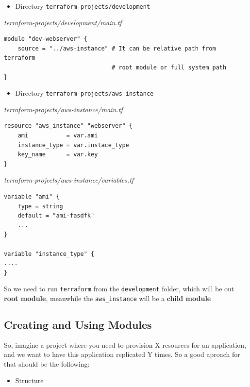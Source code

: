 \documentclass{article}
\newenvironment{codetemplate}[1][]{%
  \mybasecolorbox[#1]
  \itshape
}{%
  \endmybasecolorbox
}
\begin{document}
\begin{itemize}
    \item Directory \verb|terraform-projects/development|
\end{itemize}
\begin{codetemplate}{terraform-projects/development/main.tf}
\begin{verbatim}
module "dev-webserver" {
    source = "../aws-instance" # It can be relative path from terraform
                               # root module or full system path
}
\end{verbatim}
\end{codetemplate}

\begin{itemize}
    \item Directory \verb|terraform-projects/aws-instance|
\end{itemize}
\begin{codetemplate}{terraform-projects/aws-instance/main.tf}
\begin{verbatim}
resource "aws_instance" "webserver" {
    ami           = var.ami
    instance_type = var.instace_type
    key_name      = var.key
}
\end{verbatim}
\end{codetemplate}

\begin{codetemplate}{terraform-projects/aws-instance/variables.tf}
\begin{verbatim}
variable "ami" {
    type = string
    default = "ami-fasdfk"
    ...
}

variable "instance_type" {
....
}
\end{verbatim}
\end{codetemplate}

So we need to run \verb|terraform| from the \verb|development| folder, which will be out \textbf{root module}, meanwhile the \verb|aws_instance| will be a \textbf{child module}

\subsection{Creating and Using Modules}

So, imagine a project where you need to provision X resources for an application, and we want to have this application replicated Y times. So a good aproach for that should be the following:

\begin{itemize}
    \item Structure
\end{itemize}
\end{document}
